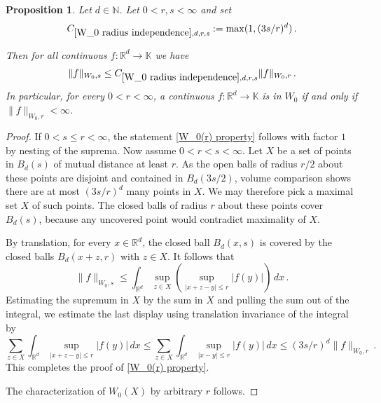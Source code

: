 \documentclass[12pt,reqno]{amsart}
\theoremstyle{plain}
\newtheorem{proposition}[theorem]{Proposition}
\numberwithin{equation}{section}
\theoremstyle{remark}
\newcommand{\R}{{\mathbb R}}
\newcommand{\N}{{\mathbb N}}
\begin{document}
\begin{proposition}\label{W_0 radius independence}
Let $d\in \N$.
Let $0<r,s<\infty$ and set
\begin{equation}\label{auto:Wiener-radius-comparison-constant}
    C_{\ref{W_0 radius independence},d,r,s}:=\max(1,(3s/r)^d)\, .
\end{equation}

Then for all continuous
$f:\R^d\to \mathbb{K}$ we have
\begin{equation}\label{W_0(r) property}
    \|f\|_{W_0,s}\le C_{\ref{W_0 radius independence},d,r,s}\|f\|_{W_0,r}\, .
\end{equation}
In particular, for every $0<r<\infty$, a  continuous
$f:\R^d\to \mathbb{K}$ is in $W_0$ if and only if $\|f\|_{W_0,r}<\infty$.
\end{proposition}

\begin{proof}
If $0<s\le r<\infty$, the statement \eqref{W_0(r) property} follows with factor $1$  by nesting of the suprema. Now assume $0<r<s<\infty.$
Let $X$ be a set of points in $B_d(s)$ of
mutual distance at least $r$. As the open balls of radius $r/2$ about these points are disjoint and contained in $B_d(3s/2)$, volume comparison shows there
are at most $(3s/r)^d$ many points in $X$.
We may therefore pick a maximal set $X$ of such points. The closed balls of radius $r$ about these
points cover $B_d(s)$, because any uncovered point would contradict maximality of $X$.

By translation, for every $x\in \R^d$,
the closed ball $B_d(x,s)$ is covered by the closed balls
$B_d(x+z,r)$ with $z\in X$. It follows that
\begin{equation*}
    \|f\|_{W_0,s}\le \int_{\R^d} \sup_{z\in X} \left(\sup_{|x+z-y|\le r} |f(y)|\right)\,dx\, .
\end{equation*}
Estimating the supremum in $X$ by the sum in $X$ and pulling the sum out of the integral, we estimate the last display using translation invariance of the integral by
\begin{equation*}
         \sum_{z\in X} \int_{\R^d} \sup_{|x+z-y|\le r} |f(y)|\,dx \le \sum_{z\in X} \int_{\R^d} \sup_{|x-y|\le r} |f(y)|\,dx\le (3s/r)^d \|f\|_{W_0,r}\, .
\end{equation*}
This completes the proof of \eqref{W_0(r) property}.


The characterization of $W_0(X)$ by arbitrary $r$ follows.


\end{proof}
\end{document}
